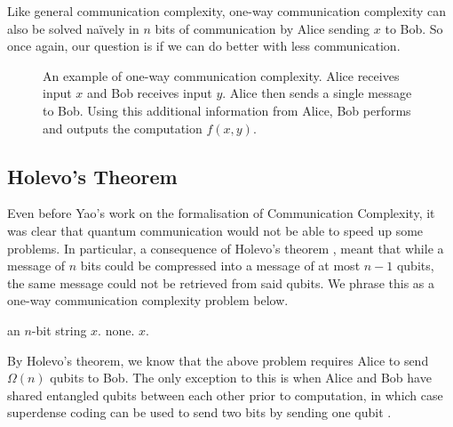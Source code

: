 \documentclass[a4paper]{article}
\begin{document}
        Like general communication complexity, one-way communication complexity can also be solved na\"{i}vely in $n$ bits of communication by Alice sending $x$ to Bob. So once again, our question is if we can do better with less communication.

        \begin{figure}[t]
            \centering
            \caption{An example of one-way communication complexity. Alice receives input $x$ and Bob receives input $y$. Alice then sends a single message to Bob. Using this additional information from Alice, Bob performs and outputs the computation $f(x, y)$.}
            \label{fig:ow-cc}
        \end{figure}

        \subsection{Holevo's Theorem}

        Even before Yao's work on the formalisation of Communication Complexity, it was clear that quantum communication would not be able to speed up some problems. In particular, a consequence of Holevo's theorem \cite{Hol73}, meant that while a message of $n$ bits could be compressed into a message of at most $n-1$ qubits, the same message could not be retrieved from said qubits. We phrase this as a one-way communication complexity problem below.

        \begin{codebox}
            \zi {} an $n$-bit string $x$.
            \zi {} none.
            \zi {} $x$.
        \end{codebox}

    By Holevo's theorem, we know that the above problem requires Alice to send $\Omega(n)$ qubits to Bob. The only exception to this is when Alice and Bob have shared entangled qubits between each other prior to computation, in which case superdense coding can be used to send two bits by sending one qubit \cite{PhysRevLett.69.2881}.
\end{document}
